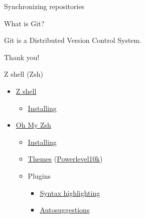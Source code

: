 \documentclass{beamer}
\begin{document}
    \begin{frame}{Synchronizing repositories}
        \begin{center}
        \end{center}
    \end{frame}

    \begin{frame}{What is Git?}
        \begin{center}
            \alert{Git} is a Distributed Version Control System.
        \end{center}
    \end{frame}

    \begin{frame}[standout]
        Thank you! \faSmileO
    \end{frame}

    \appendix

    \begin{frame}{Z shell (Zsh)}
        \begin{itemize}
            \item\href{https://en.wikipedia.org/wiki/Z\_shell}{Z shell}
            \begin{itemize}
                \item\href{https://github.com/ohmyzsh/ohmyzsh/wiki/Installing-ZSH}{Installing}
            \end{itemize}
            \item\href{https://ohmyz.sh}{Oh My Zsh}
            \begin{itemize}
                \item\href{https://ohmyz.sh/\#install}{Installing}
                \item\href{https://github.com/ohmyzsh/ohmyzsh/wiki/Themes}{Themes} (\href{https://github.com/romkatv/powerlevel10k\#installation}{Powerlevel10k})
                \item Plugins
                \begin{itemize}
                    \item\href{https://github.com/zsh-users/zsh-syntax-highlighting/blob/master/INSTALL.md}{Syntax highlighting}
                    \item\href{https://github.com/zsh-users/zsh-autosuggestions/blob/master/INSTALL.md\#oh-my-zsh}{Autosuggestions}
                \end{itemize}
            \end{itemize}
        \end{itemize}
    \end{frame}
\end{document}
